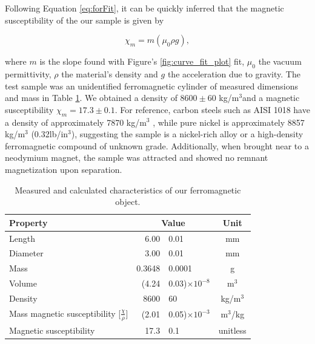  Following Equation \ref{eq:forFit}, it can be quickly inferred that the magnetic susceptibility of the our sample is given by 
 
 \begin{equation}
 \chi_m = m (\mu_0 \rho g),  
 \end{equation}

\noindent where $m$ is the slope found with Figure's \ref{fig:curve_fit_plot} fit, $\mu_0$ the vacuum permittivity, $\rho$ the material's density and $g$ the acceleration due to gravity. The test sample was an unidentified ferromagnetic cylinder of measured dimensions and mass in Table \ref{tab:subjectProp}. We obtained a density of $8600 \pm 60$ kg/m$^3$and a magnetic susceptibility $\chi_m = 17.3 \pm 0.1$. For reference, carbon steels such as AISI 1018 have a density of approximately 7870 kg/m$^3$ \cite{matweb_1018}, while pure nickel is approximately 8857 kg/m$^3$ (0.32lb/in$^3$)\cite{mcmaster_ni200}, suggesting the sample is a nickel-rich alloy or a high-density ferromagnetic compound of unknown grade. Additionally, when brought near to a neodymium magnet, the sample was attracted and showed no remnant magnetization upon separation.

\begin{table}[hbt!]
	\centering
	\caption[Properties of the magnetic object – experimental values]{Measured and calculated characteristics of our ferromagnetic object.}
	\begin{tabular}{|l|r@{\,$\pm$\,}l|c|}
		\hline
		Property & \multicolumn{2}{c|}{Value} & Unit \\
		\hline
		Length & 6.00 & 0.01 & mm \\
		Diameter & 3.00 & 0.01 & mm \\
		Mass & 0.3648 & 0.0001 & g \\
		\hline
		Volume & (4.24 & 0.03)$\times 10^{-8}$ & m$^3$ \\
		Density & 8600 & 60 & kg/m$^3$ \\
		Mass magnetic susceptibility [$\frac{\chi}{\rho}$] & (2.01 & 0.05)$\times 10^{-3}$ & m$^3$/kg \\
		Magnetic susceptibility & 17.3 & 0.1 & unitless \\
		\hline
	\end{tabular}
	\label{tab:subjectProp}
\end{table}

